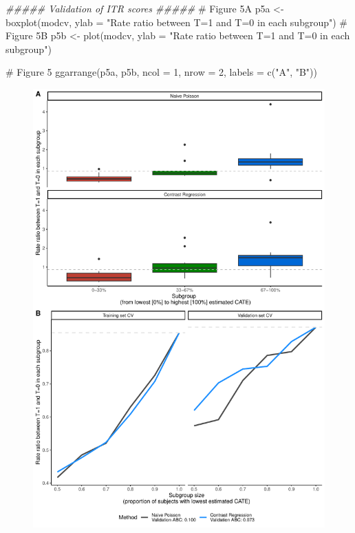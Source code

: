 \documentclass[
  letterpaper,
  DIV=11,
  numbers=noendperiod]{scrreprt}
\newenvironment{Shaded}{\begin{snugshade}}{\end{snugshade}}
\newcommand{\AttributeTok}[1]{\textcolor[rgb]{0.40,0.45,0.13}{#1}}
\newcommand{\CommentTok}[1]{\textcolor[rgb]{0.37,0.37,0.37}{#1}}
\newcommand{\DecValTok}[1]{\textcolor[rgb]{0.68,0.00,0.00}{#1}}
\newcommand{\DocumentationTok}[1]{\textcolor[rgb]{0.37,0.37,0.37}{\textit{#1}}}
\newcommand{\FunctionTok}[1]{\textcolor[rgb]{0.28,0.35,0.67}{#1}}
\newcommand{\NormalTok}[1]{\textcolor[rgb]{0.00,0.23,0.31}{#1}}
\newcommand{\OtherTok}[1]{\textcolor[rgb]{0.00,0.23,0.31}{#1}}
\newcommand{\StringTok}[1]{\textcolor[rgb]{0.13,0.47,0.30}{#1}}
\begin{document}
\begin{Shaded}
\begin{Highlighting}[]
\DocumentationTok{\#\#\#\#\# Validation of ITR scores \#\#\#\#\#}
\CommentTok{\# Figure 5A}
\NormalTok{p5a }\OtherTok{\textless{}{-}} \FunctionTok{boxplot}\NormalTok{(modcv, }\AttributeTok{ylab =} \StringTok{"Rate ratio between T=1 and T=0 in each subgroup"}\NormalTok{)}
\CommentTok{\# Figure 5B}
\NormalTok{p5b }\OtherTok{\textless{}{-}} \FunctionTok{plot}\NormalTok{(modcv, }\AttributeTok{ylab =} \StringTok{"Rate ratio between T=1 and T=0 in each subgroup"}\NormalTok{)}

\CommentTok{\# Figure 5}
\FunctionTok{ggarrange}\NormalTok{(p5a, p5b, }\AttributeTok{ncol =} \DecValTok{1}\NormalTok{, }\AttributeTok{nrow =} \DecValTok{2}\NormalTok{, }\AttributeTok{labels =} \FunctionTok{c}\NormalTok{(}\StringTok{"A"}\NormalTok{, }\StringTok{"B"}\NormalTok{))}
\end{Highlighting}
\end{Shaded}

\begin{figure}[H]

{\centering \includegraphics{chapter_18_files/figure-pdf/validation-1.pdf}

}

\end{figure}
\end{document}
